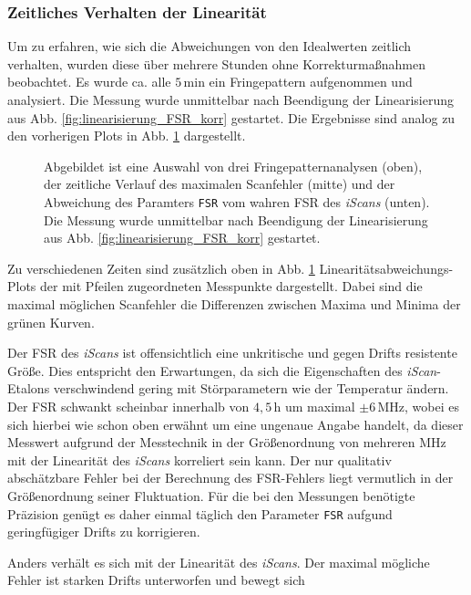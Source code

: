 \subsubsection{Zeitliches Verhalten
der Linearität}\label{subsubsec:linearitaet_verlauf}
Um zu erfahren, wie
sich die Abweichungen von den Idealwerten zeitlich verhalten, wurden diese über
mehrere Stunden ohne Korrekturmaßnahmen beobachtet. Es wurde ca. alle $5\,$min ein Fringepattern aufgenommen und analysiert. Die Messung wurde unmittelbar nach Beendigung der Linearisierung aus Abb.
\ref{fig:linearisierung_FSR_korr} gestartet.
Die Ergebnisse sind analog zu den vorherigen Plots in Abb.
\ref{fig:linearitaet_verlauf} dargestellt.
\begin{figure}
	 	\centering
	 	\footnotesize
		
		\caption[Linearitaet \textit{iScan}, zeitlicher Verlauf]{Abgebildet ist eine
		Auswahl von drei Fringepatternanalysen (oben), der zeitliche Verlauf des
		maximalen Scanfehler (mitte) und der Abweichung des Paramters \lstinline|FSR|
		vom wahren FSR des \textit{iScans} (unten). Die Messung wurde unmittelbar nach Beendigung der Linearisierung aus Abb.
		\ref{fig:linearisierung_FSR_korr} gestartet.}
		\label{fig:linearitaet_verlauf}
\end{figure}
Zu verschiedenen Zeiten sind zusätzlich oben in Abb.
\ref{fig:linearitaet_verlauf} Linearitätsabweichungs-Plots der mit Pfeilen
zugeordneten Messpunkte dargestellt. Dabei sind die maximal möglichen Scanfehler
die Differenzen zwischen Maxima und Minima der grünen Kurven.\par
Der FSR des
\textit{iScans} ist offensichtlich eine unkritische und gegen Drifts
resistente Größe. Dies entspricht den Erwartungen, da sich die Eigenschaften des
\textit{iScan}-Etalons verschwindend gering mit Störparametern wie der
Temperatur ändern. Der FSR schwankt scheinbar innerhalb von $4,5\,$h um maximal
$\pm6\,$MHz, wobei es sich hierbei wie schon oben erwähnt um eine ungenaue
Angabe handelt, da dieser Messwert aufgrund der Messtechnik in der Größenordnung von mehreren MHz mit der Linearität des \textit{iScans} korreliert sein kann. Der nur qualitativ abschätzbare Fehler bei der Berechnung des FSR-Fehlers liegt vermutlich in der Größenordnung seiner
Fluktuation. Für die bei den Messungen benötigte Präzision genügt es daher
einmal täglich den Parameter \lstinline|FSR| aufgund geringfügiger Drifts zu korrigieren.\par
Anders verhält es sich mit der Linearität des \textit{iScans}.
Der maximal mögliche Fehler ist starken Drifts unterworfen und bewegt sich
